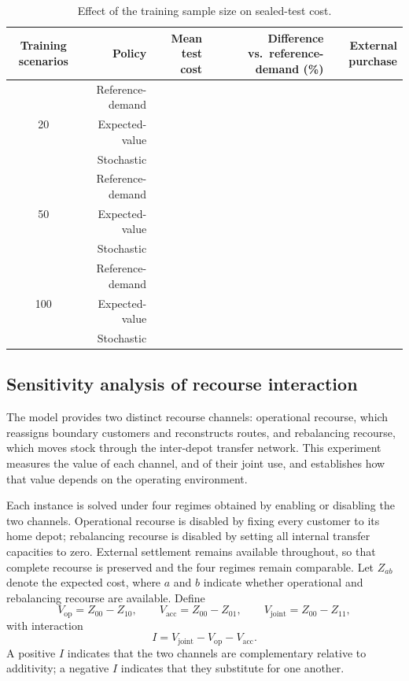 \documentclass[authoryear,final,3p,times]{elsarticle}
\theoremstyle{definition}
\theoremstyle{plain}
\begin{document}
\begin{table}[!htbp]
\centering
\caption{Effect of the training sample size on sealed-test cost.}
\label{tab:e3_sample_size}
\begin{tabular}{crrrr}
\toprule
Training scenarios & Policy & Mean test cost & Difference vs.\ reference-demand (\%) & External purchase\\
\midrule
\multirow{3}{*}{20} & Reference-demand & & & \\
                    & Expected-value     & & & \\
                    & Stochastic         & & & \\
\midrule
\multirow{3}{*}{50} & Reference-demand & & & \\
                    & Expected-value     & & & \\
                    & Stochastic         & & & \\
\midrule
\multirow{3}{*}{100} & Reference-demand & & & \\
                     & Expected-value     & & & \\
                     & Stochastic         & & & \\
\bottomrule
\end{tabular}
\end{table}

\subsection{Sensitivity analysis of recourse interaction}
\label{subsec:e4_recourse_interaction}

The model provides two distinct recourse channels: operational recourse, which
reassigns boundary customers and reconstructs routes, and rebalancing recourse,
which moves stock through the inter-depot transfer network.  This
experiment measures the value of each channel, and of their joint use, and
establishes how that value depends on the operating environment.

Each instance is solved under four regimes obtained by enabling or disabling
the two channels.  Operational recourse is disabled by fixing every customer
to its home depot; rebalancing recourse is disabled by setting all internal
transfer capacities to zero.  External settlement remains available throughout,
so that complete recourse is preserved and the four regimes remain comparable.
Let $Z_{ab}$ denote the expected cost, where $a$ and $b$ indicate whether
operational and rebalancing recourse are available.  Define
\begin{equation}
 V_{\mathrm{op}}=Z_{00}-Z_{10},\qquad
 V_{\mathrm{acc}}=Z_{00}-Z_{01},\qquad
 V_{\mathrm{joint}}=Z_{00}-Z_{11},
 \label{eq:recourse_values}
\end{equation}
with interaction
\begin{equation}
 I=V_{\mathrm{joint}}-V_{\mathrm{op}}-V_{\mathrm{acc}}.
 \label{eq:interaction_index}
\end{equation}
A positive $I$ indicates that the two channels are complementary relative to
additivity; a negative $I$ indicates that they substitute for one another.
\end{document}
